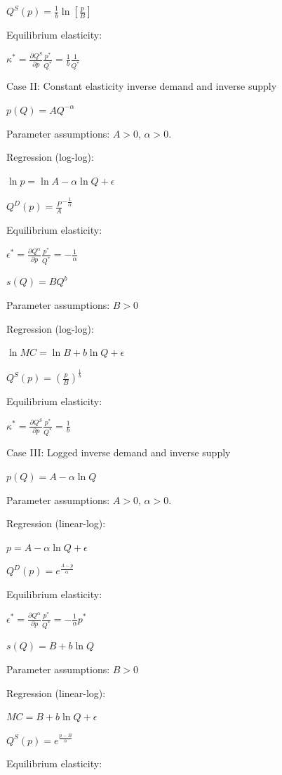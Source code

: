 \documentclass[
]{book}
\begin{document}
\(Q^S(p)=\frac{1}{b}\ln\left[\frac{p}{B}\right]\)

Equilibrium elasticity:

\(\kappa^\ast = \frac{\partial Q^S}{\partial p}\frac{p^\ast}{Q^\ast} = \frac{1}{b}\frac{1}{Q^\ast}\)

Case II: Constant elasticity inverse demand and inverse supply

\(p(Q) = AQ^{-\alpha}\)

Parameter assumptions:
\(A>0\), \(\alpha>0\).

Regression (log-log):

\(\ln p = \ln A - \alpha \ln Q + \epsilon\)

\(Q^D (p)=\frac{P}{A}^{-\frac{1}{\alpha}}\)

Equilibrium elasticity:

\(\epsilon^\ast=\frac{\partial Q^\alpha}{\partial p}\frac{p^\ast}{Q^\ast}=-\frac{1}{\alpha}\)

\(s(Q)=BQ^b\)

Parameter assumptions:
\(B>0\)

Regression (log-log):

\(\ln MC = \ln B + b \ln Q + \epsilon\)

\(Q^S(p)=\left(\frac{p}{B}\right)^{\frac{1}{b}}\)

Equilibrium elasticity:

\(\kappa^\ast = \frac{\partial Q^S}{\partial p}\frac{p^\ast}{Q^\ast} = \frac{1}{b}\)

Case III: Logged inverse demand and inverse supply

\(p(Q)=A-\alpha \ln Q\)

Parameter assumptions:
\(A>0\), \(\alpha>0\).

Regression (linear-log):

\(p=A- \alpha \ln Q + \epsilon\)

\(Q^D (p)=e^{\frac{A-p}{\alpha}}\)

Equilibrium elasticity:

\(\epsilon^\ast=\frac{\partial Q^\alpha}{\partial p}\frac{p^\ast}{Q^\ast}=-\frac{1}{\alpha}p^\ast\)

\(s(Q) = B + b \ln Q\)

Parameter assumptions:
\(B>0\)

Regression (linear-log):

\(MC = B + b \ln Q + \epsilon\)

\(Q^S(p)=e^{\frac{p-B}{b}}\)

Equilibrium elasticity:
\end{document}
